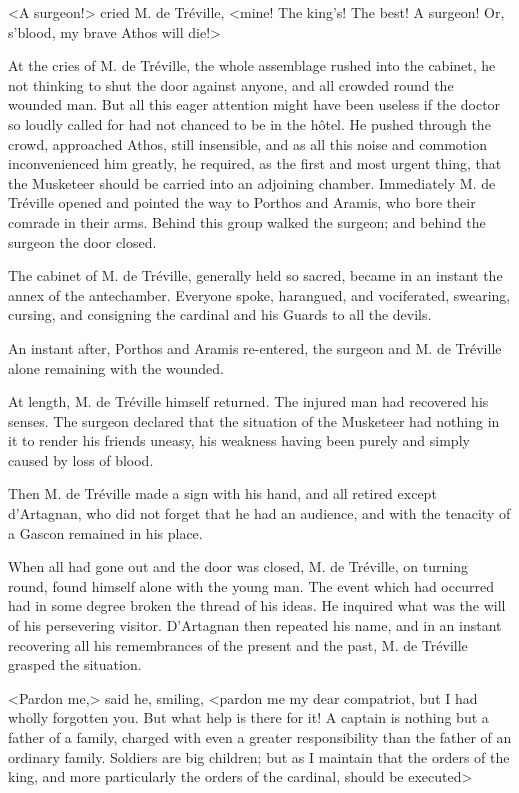 <A surgeon!> cried M. de Tréville, <mine! The king's! The best! A surgeon! Or, s'blood, my brave Athos will die!> 

At the cries of M. de Tréville, the whole assemblage rushed into the cabinet, he not thinking to shut the door against anyone, and all crowded round the wounded man. But all this eager attention might have been useless if the doctor so loudly called for had not chanced to be in the hôtel. He pushed through the crowd, approached Athos, still insensible, and as all this noise and commotion inconvenienced him greatly, he required, as the first and most urgent thing, that the Musketeer should be carried into an adjoining chamber. Immediately M. de Tréville opened and pointed the way to Porthos and Aramis, who bore their comrade in their arms. Behind this group walked the surgeon; and behind the surgeon the door closed. 

The cabinet of M. de Tréville, generally held so sacred, became in an instant the annex of the antechamber. Everyone spoke, harangued, and vociferated, swearing, cursing, and consigning the cardinal and his Guards to all the devils. 

An instant after, Porthos and Aramis re-entered, the surgeon and M. de Tréville alone remaining with the wounded. 

At length, M. de Tréville himself returned. The injured man had recovered his senses. The surgeon declared that the situation of the Musketeer had nothing in it to render his friends uneasy, his weakness having been purely and simply caused by loss of blood. 

Then M. de Tréville made a sign with his hand, and all retired except d'Artagnan, who did not forget that he had an audience, and with the tenacity of a Gascon remained in his place. 

When all had gone out and the door was closed, M. de Tréville, on turning round, found himself alone with the young man. The event which had occurred had in some degree broken the thread of his ideas. He inquired what was the will of his persevering visitor. D'Artagnan then repeated his name, and in an instant recovering all his remembrances of the present and the past, M. de Tréville grasped the situation. 

<Pardon me,> said he, smiling, <pardon me my dear compatriot, but I had wholly forgotten you. But what help is there for it! A captain is nothing but a father of a family, charged with even a greater responsibility than the father of an ordinary family. Soldiers are big children; but as I maintain that the orders of the king, and more particularly the orders of the cardinal, should be executed\longdash> 

